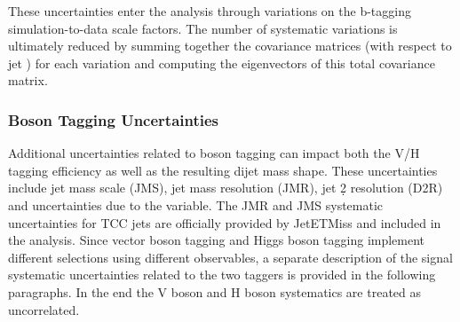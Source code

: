 These uncertainties enter the analysis through variations on the b-tagging simulation-to-data scale factors.
The number of systematic variations is ultimately reduced by summing together the covariance matrices (with respect to jet \pt) for each variation and computing the eigenvectors of this total covariance matrix.

\subsubsection{Boson Tagging Uncertainties}
\label{sec:syst-boson}
Additional uncertainties related to boson tagging can impact both the V/H tagging efficiency as well as the resulting dijet mass shape.
These uncertainties include jet mass scale (JMS), jet mass resolution (JMR), jet \d2 resolution (D2R) and uncertainties due to the \ntrk variable.
The JMR and JMS systematic uncertainties for TCC jets are officially provided by JetETMiss and included in the analysis.
Since vector boson tagging and Higgs boson tagging implement different selections using different observables, a separate description of the signal systematic uncertainties related to the two taggers is provided in the following paragraphs.
In the end the V boson and H boson systematics are treated as uncorrelated.

